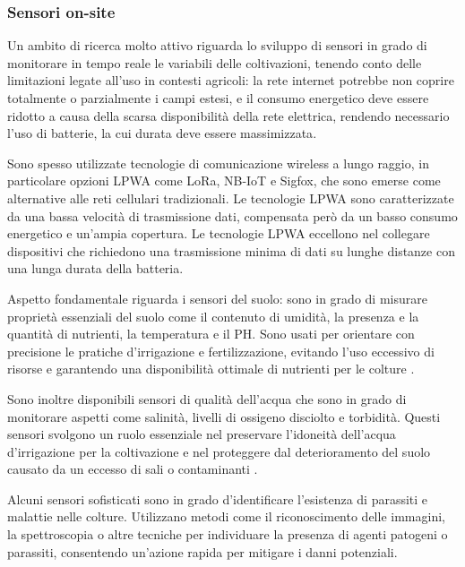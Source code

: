 \documentclass[12pt,a4paper,openright,twoside, openany]{book}
\begin{document}
\subsubsection{Sensori on-site}

Un ambito di ricerca molto attivo riguarda lo sviluppo di sensori in grado di monitorare in tempo reale le variabili delle coltivazioni, tenendo conto delle limitazioni legate all'uso in contesti agricoli: la rete internet potrebbe non coprire totalmente o parzialmente i campi estesi, e il consumo energetico deve essere ridotto a causa della scarsa disponibilità della rete elettrica, rendendo necessario l'uso di batterie, la cui durata deve essere massimizzata\cite{s24082647}.

Sono spesso utilizzate tecnologie di comunicazione wireless a lungo raggio, in particolare opzioni \ac{LPWA} come LoRa, NB-IoT e Sigfox, che sono emerse come alternative alle reti cellulari tradizionali\cite{bhoyar2019communication}.
Le tecnologie LPWA sono caratterizzate da una bassa velocità di trasmissione dati, compensata però da un basso consumo energetico e un'ampia copertura. Le tecnologie LPWA eccellono nel collegare dispositivi che richiedono una trasmissione minima di dati su lunghe distanze con una lunga durata della batteria\cite{dai2019low}.

Aspetto fondamentale riguarda i sensori del suolo: sono in grado di misurare proprietà essenziali del suolo come il contenuto di umidità, la presenza e la quantità di nutrienti, la temperatura e il PH. Sono usati per orientare con precisione le pratiche d'irrigazione e fertilizzazione, evitando l'uso eccessivo di risorse e garantendo una disponibilità ottimale di nutrienti per le colture \cite{vuran2018internet}.

Sono inoltre disponibili sensori di qualità dell'acqua che sono in grado di monitorare aspetti come salinità, livelli di ossigeno disciolto e torbidità. Questi sensori svolgono un ruolo essenziale nel preservare l'idoneità dell'acqua d'irrigazione per la coltivazione e nel proteggere dal deterioramento del suolo causato da un eccesso di sali o contaminanti \cite{garcia2020iot}.

Alcuni sensori sofisticati sono in grado d'identificare l'esistenza di parassiti e malattie nelle colture. Utilizzano metodi come il riconoscimento delle immagini, la spettroscopia o altre tecniche per individuare la presenza di agenti patogeni o parassiti, consentendo un'azione rapida per mitigare i danni potenziali\cite{che2022mobile}.
\end{document}

